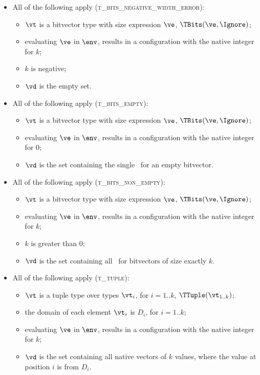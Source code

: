 \begin{itemize}
  \item All of the following apply (\textsc{t\_bits\_negative\_width\_error}):
  \begin{itemize}
    \item $\vt$ is a bitvector type with size expression $\ve$, $\TBits(\ve, \Ignore)$;
    \item evaluating $\ve$ in $\env$, results in a configuration with the native integer for $k$;
    \item $k$ is negative;
    \item $\vd$ is the empty set.
  \end{itemize}

  \item All of the following apply (\textsc{t\_bits\_empty}):
  \begin{itemize}
    \item $\vt$ is a bitvector type with size expression $\ve$, $\TBits(\ve, \Ignore)$;
    \item evaluating $\ve$ in $\env$, results in a configuration with the native integer for $0$;
    \item $\vd$ is the set containing the single \nativevalue\ for an empty bitvector.
  \end{itemize}

  \item All of the following apply (\textsc{t\_bits\_non\_empty}):
  \begin{itemize}
    \item $\vt$ is a bitvector type with size expression $\ve$, $\TBits(\ve, \Ignore)$;
    \item evaluating $\ve$ in $\env$, results in a configuration with the native integer for $k$;
    \item $k$ is greater than $0$;
    \item $\vd$ is the set containing all \nativevalues\ for bitvectors of size exactly $k$.
  \end{itemize}

  \item All of the following apply (\textsc{t\_tuple}):
  \begin{itemize}
    \item $\vt$ is a tuple type over types $\vt_i$, for $i=1..k$, $\TTuple(\vt_{1..k})$;
    \item the domain of each element $\vt_i$ is $D_i$, for $i=1..k$;
    \item evaluating $\ve$ in $\env$, results in a configuration with the native integer for $k$;
    \item $\vd$ is the set containing all native vectors of $k$ values, where the value at position $i$
    is from $D_i$.
  \end{itemize}


\end{itemize}
